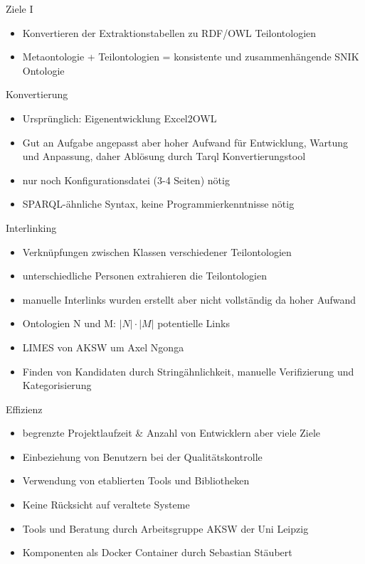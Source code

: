 \documentclass{beamer}
\begin{document}
\begin{frame}{Ziele I}
\begin{itemize}
\item Konvertieren der Extraktionstabellen zu RDF/OWL Teilontologien 
\item Metaontologie + Teilontologien = konsistente und zusammenhängende SNIK Ontologie 
\end{itemize}
\end{frame}

\begin{frame}{Konvertierung}
\begin{itemize}
\item Ursprünglich: Eigenentwicklung Excel2OWL 
\item Gut an Aufgabe angepasst aber hoher Aufwand für Entwicklung, Wartung und Anpassung, daher Ablösung durch Tarql Konvertierungstool
\item nur noch Konfigurationsdatei (3-4 Seiten) nötig
\item SPARQL-ähnliche Syntax, keine Programmierkenntnisse nötig
\end{itemize}
\end{frame}

\begin{frame}{Interlinking}
\begin{itemize}
\item Verknüpfungen zwischen Klassen verschiedener Teilontologien
\item unterschiedliche Personen extrahieren die Teilontologien 
\item manuelle Interlinks wurden erstellt aber nicht vollständig da hoher Aufwand
\item Ontologien N und M: $|N| \cdot |M|$ potentielle Links
\item LIMES von AKSW um Axel Ngonga
\item Finden von Kandidaten durch Stringähnlichkeit, manuelle Verifizierung und Kategorisierung
\end{itemize}
\end{frame}


\begin{frame}{Effizienz}
\begin{itemize}
\item begrenzte Projektlaufzeit \& Anzahl von Entwicklern aber viele Ziele
\item Einbeziehung von Benutzern bei der Qualitätskontrolle 
\item Verwendung von etablierten Tools und Bibliotheken 
\item Keine Rücksicht auf veraltete Systeme
\item Tools und Beratung durch Arbeitsgruppe AKSW der Uni Leipzig
\item Komponenten als Docker Container durch Sebastian Stäubert 
\end{itemize}
\end{frame}
\end{document}
